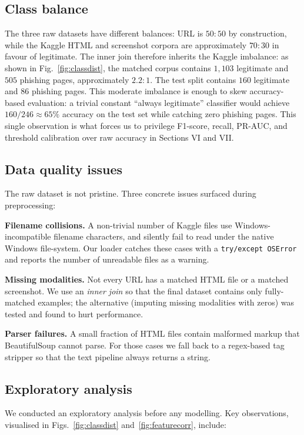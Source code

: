 \documentclass[conference]{IEEEtran}
\begin{document}
\subsection{Class balance}
The three raw datasets have different balances: URL is $50{:}50$ by
construction, while the Kaggle HTML and screenshot corpora are
approximately $70{:}30$ in favour of legitimate. The inner join
therefore inherits the Kaggle imbalance: as shown in
Fig.~\ref{fig:classdist}, the matched corpus contains $1{,}103$
legitimate and $505$ phishing pages, approximately $2.2{:}1$. The
test split contains $160$ legitimate and $86$ phishing pages. This
moderate imbalance is enough to skew accuracy-based evaluation: a
trivial constant ``always legitimate'' classifier would achieve
$160/246\approx65\%$ accuracy on the test set while catching zero
phishing pages. This single observation is what forces us to
privilege F1-score, recall, PR-AUC, and threshold calibration over
raw accuracy in Sections VI and VII.

\subsection{Data quality issues}
The raw dataset is not pristine. Three concrete issues surfaced
during preprocessing:

\noindent\textbf{Filename collisions.} A non-trivial number of
Kaggle files use Windows-incompatible filename characters, and
silently fail to read under the native Windows file-system. Our
loader catches these cases with a \texttt{try/except OSError} and
reports the number of unreadable files as a warning.

\noindent\textbf{Missing modalities.} Not every URL has a matched
HTML file or a matched screenshot. We use an \emph{inner join} so
that the final dataset contains only fully-matched examples; the
alternative (imputing missing modalities with zeros) was tested
and found to hurt performance.

\noindent\textbf{Parser failures.} A small fraction of HTML files
contain malformed markup that BeautifulSoup cannot parse. For those
cases we fall back to a regex-based tag stripper so that the text
pipeline always returns a string.

\subsection{Exploratory analysis}
We conducted an exploratory analysis before any modelling. Key
observations, visualised in Figs.~\ref{fig:classdist}
and~\ref{fig:featurecorr}, include:
\end{document}
